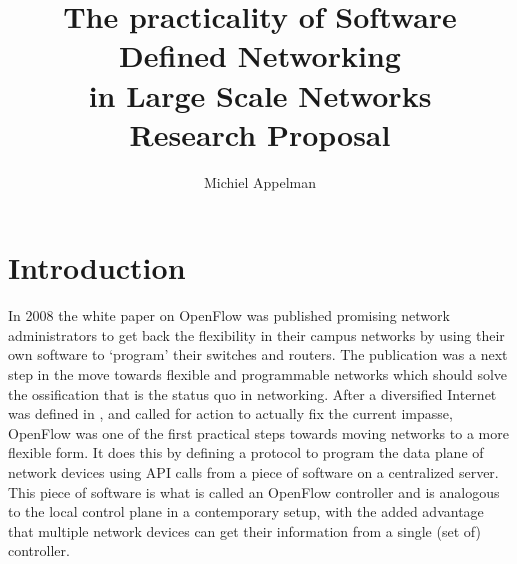 \documentclass[oneside,twocolumn,7pt,a4paper]{article}
\title{The practicality of Software Defined Networking\\
in Large Scale Networks\\[0.3cm]
\large{Research Proposal}}
\author{Michiel Appelman}
\begin{document}
	\maketitle
	



	
	\section{Introduction} %
	\label{sec:introduction}
	In 2008 the white paper on OpenFlow was published \cite{openflow} promising network administrators to get back the flexibility in their campus networks by using their own software to `program' their switches and routers.
	The publication was a next step in the move towards flexible and programmable networks which should solve the ossification that is the status quo in networking. After a diversified Internet was defined in \cite{diversifiedinternet}, and \cite{overcomingimpasse} called for action to actually fix the current impasse, OpenFlow was one of the first practical steps towards moving networks to a more flexible form.
	It does this by defining a protocol to program the data plane of network devices using API calls from a piece of software on a centralized server. This piece of software is what is called an OpenFlow controller and is analogous to the local control plane in a contemporary setup, with the added advantage that multiple network devices can get their information from a single (set of) controller.
	
\end{document}
